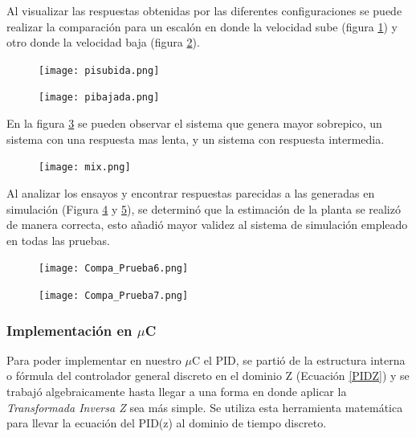     Al visualizar las respuestas obtenidas por las diferentes configuraciones se puede realizar la comparación para un escalón en donde la velocidad sube (figura \ref{fig:pisubuda}) y otro donde la velocidad baja (figura \ref{fig:pibajada}).
    
    \begin{figure}[H]
    	\centering
    	\texttt{[image: pisubida.png]}
    	\label{fig:pisubuda}
    \end{figure}
    
    \begin{figure}[H]
    	\centering
    	\texttt{[image: pibajada.png]}
    	\label{fig:pibajada}
    \end{figure}
    
    
    En la figura \ref{fig:mix} se pueden observar el sistema que genera mayor sobrepico, un sistema con una respuesta mas lenta, y un sistema con respuesta intermedia. 
    \begin{figure}[H]
    	\centering
    	\texttt{[image: mix.png]}
    	\label{fig:mix}
    \end{figure}

	Al analizar los ensayos y encontrar respuestas parecidas a las generadas en simulación (Figura \ref{fig:Prueba_6} y \ref{fig:Prueba_7}), se determinó que la estimación de la planta se realizó de manera correcta, esto añadió mayor validez al sistema de simulación empleado en todas las pruebas. 
	
	\begin{figure}[H]
		\centering
		\texttt{[image: Compa\_Prueba6.png]}
		\label{fig:Prueba_6}
	\end{figure}   
\begin{figure}[H]
	\centering
	\texttt{[image: Compa\_Prueba7.png]}
	\label{fig:Prueba_7}
\end{figure}   
    \subsubsection{Implementación en $\mu$C}
    
    Para poder implementar en nuestro $\mu$C  el PID, se partió de la estructura interna o fórmula del controlador general discreto en el dominio Z (Ecuación \ref{PIDZ}) y se trabajó algebraicamente hasta llegar a una forma en donde aplicar la \textit{Transformada Inversa Z} sea más simple. Se utiliza esta herramienta matemática para llevar la ecuación del PID(z) al dominio de tiempo discreto.
    
